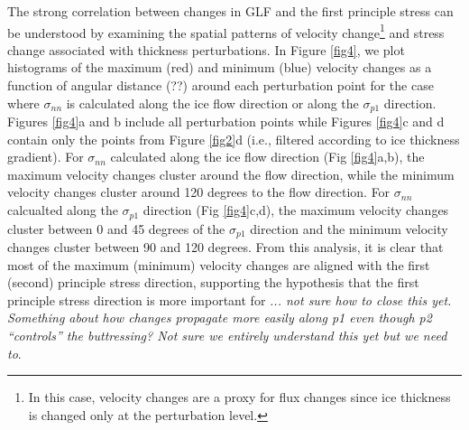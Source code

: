 \documentclass[review,oneside]{igs}
\begin{document}
The strong correlation between changes in GLF and the first principle stress can be understood by examining the spatial patterns of velocity change\footnote{In this case, velocity changes are a proxy for flux changes since ice thickness is changed only at the perturbation level.} and stress change associated with thickness perturbations. %
In Figure \ref{fig4}, we plot histograms of the maximum (red) and minimum (blue) velocity changes as a function of angular distance (??) around each perturbation point for the case where $\sigma_{nn}$ is calculated along the ice flow direction or along the $\sigma_{p1}$ direction. Figures \ref{fig4}a and b include all perturbation points while Figures \ref{fig4}c and d contain only the points from Figure \ref{fig2}d (i.e., filtered according to ice thickness gradient). For $\sigma_{nn}$ calculated along the ice flow direction (Fig \ref{fig4}a,b), the maximum velocity changes cluster around the flow direction, while the minimum velocity changes cluster around 120 degrees to the flow direction. For $\sigma_{nn}$ calcualted along the $\sigma_{p1}$ direction (Fig \ref{fig4}c,d), the maximum velocity changes cluster between 0 and 45 degrees of the $\sigma_{p1}$ direction and the minimum velocity changes cluster between 90 and 120 degrees. From this analysis, it is clear that most of the maximum (minimum) velocity changes are aligned with the first (second) principle stress direction, supporting the hypothesis that the first principle stress direction is more important for \textit{... not sure how to close this yet. Something about how changes propagate more easily along p1 even though p2 ``controls'' the buttressing? Not sure we entirely understand this yet but we need to}.
\end{document}
